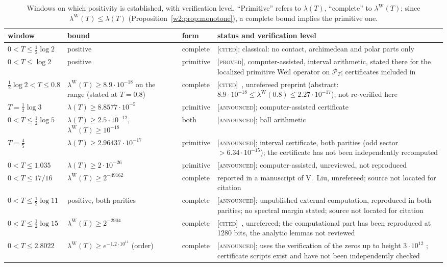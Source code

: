 \documentclass[11pt]{amsart}
\theoremstyle{definition}
\theoremstyle{remark}
\numberwithin{equation}{section}
\newcommand{\PT}{\mathcal{P}_T}                        %
\newcommand{\lam}{\lambda(T)}                          %
\newcommand{\lamW}{\lambda^{\mathrm W}(T)}             %
\newcommand{\stag}[1]{\textsc{[#1]}}
\newcommand{\PROVED}{\stag{proved}}
\newcommand{\CITED}{\stag{cited}}
\newcommand{\ANNOUNCED}{\stag{announced}}
\begin{document}
\begin{table}[htbp]
\centering\small
\renewcommand{\arraystretch}{1.15}
\begin{tabular}{p{3.0cm}p{3.6cm}p{1.4cm}p{5.2cm}}
\hline
window & bound & form & status and verification level\\
\hline
$0<T\le\frac12\log2$ & positive & complete & \CITED; classical: no contact, archimedean and polar parts only
\cite{Yoshida1992,Bombieri2000}\\
$0<T\le\log2$ & positive & primitive & \PROVED, computer-assisted, interval arithmetic, stated there for the localized primitive Weil operator on $\PT$; certificates included in
\cite[Theorem~9.18, Corollary~9.20]{P42}\\
$\frac12\log2<T\le0.8$ & $\lamW\ge8.9\cdot10^{-18}$ on the range (stated at $T=0.8$) & complete &
\CITED\ \cite{Zhu2026}, unrefereed preprint (abstract: $8.9\cdot10^{-18}\le\lambda^{\mathrm W}(0.8)\le2.27\cdot10^{-17}$); not re-verified here\\
$T=\frac12\log3$ & $\lam\ge8.8577\cdot10^{-5}$ & primitive & \ANNOUNCED; computer-assisted certificate\\
$0<T\le\frac12\log5$ & $\lam\ge2.5\cdot10^{-12}$, $\lamW\ge10^{-18}$ & both & \ANNOUNCED; ball arithmetic\\
$T=\frac45$ & $\lam\ge2.96437\cdot10^{-17}$ & primitive & \ANNOUNCED; interval certificate, both parities (odd sector
$>6.34\cdot10^{-15}$); the certificate has not been independently recomputed\\
$0<T\le1.035$ & $\lam\ge2\cdot10^{-26}$ & primitive & \ANNOUNCED; computer-assisted, unreviewed, not reproduced\\
$0<T\le17/16$ & $\lamW\ge2^{-49162}$ & complete & reported in a manuscript of V.~Liu, unrefereed; source not located for citation\\
$0<T\le\frac12\log11$ & positive, both parities & complete & \ANNOUNCED; unpublished external computation, reproduced in
both parities; no spectral margin stated; source not located for citation\\
$0<T\le\frac12\log15$ & $\lamW\ge2^{-2904}$ & complete & \CITED\ \cite{Mori15}, unrefereed; the computational part
has been reproduced at 1280 bits, the analytic lemmas not reviewed\\
$0<T\le2.8022$ & $\lamW\ge e^{-1.2\cdot10^{11}}$ (order) & complete & \ANNOUNCED; uses the verification of the zeros up
to height $3\cdot10^{12}$ \cite{PlattTrudgian2021}; certificate scripts exist and have not been independently checked\\
\hline
\end{tabular}
\caption{Windows on which positivity is established, with verification level. ``Primitive'' refers to $\lam$, ``complete''
to $\lamW$; since $\lamW\le\lam$ (Proposition~\ref{w2:prop:monotone}), a complete bound implies the primitive one.}
\label{w2:tab:certified}
\end{table}
\end{document}
